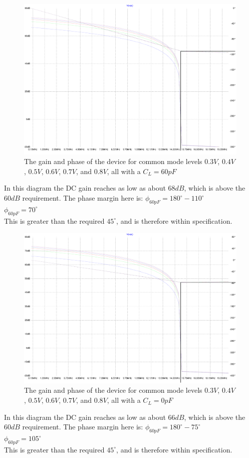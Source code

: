 \begin{figure}[H]
	\centering
	\includegraphics[width=\textwidth]{./images/BasicAC-multi-60.pdf}
	\caption{The gain and phase of the device for common mode levels $0.3V$, $0.4V$, $0.5V$, $0.6V$, $0.7V$, and $0.8V$, all with a $C_{L} = 60pF$}
	\label{fig:Sac60}
\end{figure}

In this diagram the DC gain reaches as low as about $68dB$, which is above the $60dB$ requirement.
The phase margin here is:
$\phi_{60pF} = 180^{\circ} - 110^{\circ}$ \\
$\phi_{60pF} = 70^{\circ}$ \\
This is greater than the required $45^{\circ}$, and is therefore within specification.

\begin{figure}[H]
	\centering
	\includegraphics[width=\textwidth]{./images/BasicAC-multi-0.pdf}
	\caption{The gain and phase of the device for common mode levels $0.3V$, $0.4V$, $0.5V$, $0.6V$, $0.7V$, and $0.8V$, all with a $C_{L} = 0pF$}
	\label{fig:Sac0}
\end{figure}

In this diagram the DC gain reaches as low as about $66dB$, which is above the $60dB$ requirement.
The phase margin here is:
$\phi_{60pF} = 180^{\circ} - 75^{\circ}$ \\
$\phi_{60pF} = 105^{\circ}$ \\
This is greater than the required $45^{\circ}$, and is therefore within specification.


